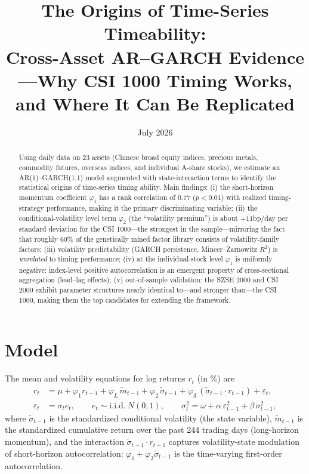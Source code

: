 \documentclass[11pt,a4paper]{article}
\title{\textbf{The Origins of Time-Series Timeability:\\ Cross-Asset AR--GARCH Evidence}\\
\large ---Why CSI 1000 Timing Works, and Where It Can Be Replicated}
\author{}
\date{July 2026}
\begin{document}
\maketitle
\vspace{-2.5em}
\begin{abstract}
\noindent Using daily data on 23 assets (Chinese broad equity indices, precious metals, commodity futures, overseas indices, and individual A-share stocks), we estimate an AR(1)--GARCH(1,1) model augmented with state-interaction terms to identify the statistical origins of time-series timing ability. Main findings: (i) the short-horizon momentum coefficient $\varphi_1$ has a rank correlation of $0.77$ ($p<0.01$) with realized timing-strategy performance, making it the primary discriminating variable; (ii) the conditional-volatility level term $\varphi_2$ (the ``volatility premium'') is about $+11$bp/day per standard deviation for the CSI 1000---the strongest in the sample---mirroring the fact that roughly 60\% of the genetically mined factor library consists of volatility-family factors; (iii) volatility predictability (GARCH persistence, Mincer--Zarnowitz $R^2$) is \emph{unrelated} to timing performance; (iv) at the individual-stock level $\varphi_1$ is uniformly negative: index-level positive autocorrelation is an emergent property of cross-sectional aggregation (lead--lag effects); (v) out-of-sample validation: the SZSE 2000 and CSI 2000 exhibit parameter structures nearly identical to---and stronger than---the CSI 1000, making them the top candidates for extending the framework.
\end{abstract}

\section{Model}
The mean and volatility equations for log returns $r_t$ (in \%) are
\begin{align}
r_t &= \mu + \varphi_1 r_{t-1} + \varphi_L\, \tilde m_{t-1} + \varphi_2\, \tilde\sigma_{t-1} + \varphi_3\,(\tilde\sigma_{t-1}\cdot r_{t-1}) + \varepsilon_t, \\
\varepsilon_t &= \sigma_t e_t,\qquad e_t \sim \mathrm{i.i.d.}\ N(0,1),\qquad
\sigma_t^2 = \omega + \alpha\,\varepsilon_{t-1}^2 + \beta\,\sigma_{t-1}^2,
\end{align}
where $\tilde\sigma_{t-1}$ is the standardized conditional volatility (the state variable), $\tilde m_{t-1}$ is the standardized cumulative return over the past 244 trading days (long-horizon momentum), and the interaction $\tilde\sigma_{t-1}\cdot r_{t-1}$ captures volatility-state modulation of short-horizon autocorrelation: $\varphi_1 + \varphi_3\tilde\sigma_{t-1}$ is the time-varying first-order autocorrelation.
\end{document}
